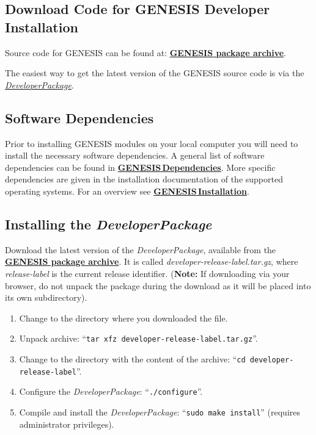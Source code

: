 \documentclass[12pt]{article}
\begin{document}
\subsection*{Download Code for GENESIS Developer Installation}

Source code for GENESIS can be found at: \href{http://repo-genesis3.cbi.utsa.edu/src/}{\bf GENESIS package archive}.

The easiest way to get the latest version of the GENESIS source code is via the  \href{../developer-package/developer-package.tex}{\it DeveloperPackage}.

\subsection*{Software Dependencies}

Prior to installing GENESIS modules on your local computer you will need to install the necessary software dependencies. A general list of software dependencies can be found in \href{../genesis-dependencies/genesis-dependencies.tex}{\bf GENESIS\,Dependencies}. More specific dependencies are given in the installation documentation of the supported operating systems. For an overview see \href{../genesis-installation/genesis-installation.tex}{\bf GENESIS\,Installation}.

\subsection*{Installing the {\it DeveloperPackage}}

Download the latest version of the {\it DeveloperPackage}, available from the \href{http://repo-genesis3.cbi.utsa.edu/src/}{\bf GENESIS package archive}.  It is called {\it developer-release-label.tar.gz}, where {\it release-label} is the current release identifier. ({\bf Note:} If downloading via your browser, do not unpack the package during the download as it will be placed into its own subdirectory).
\begin{enumerate}
   \item Change to the directory where you downloaded the file.
   \item Unpack archive: ``{\tt tar xfz developer-release-label.tar.gz}''.
   \item Change to the directory with the content of the archive: ``{\tt cd developer-release-label}''.
   \item Configure the {\it DeveloperPackage}: ``{\tt ./configure}''.
   \item Compile and install the {\it DeveloperPackage}: ``{\tt sudo make install}'' (requires administrator privileges).
\end{enumerate}
\end{document}
